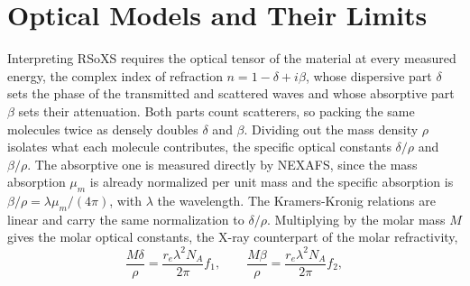 \section{Optical Models and Their Limits}\label{sec:optical-models-and-their-limits}

Interpreting RSoXS requires the optical tensor of the material at every measured energy, the complex index of refraction \(n = 1 - \delta + i\beta\), whose dispersive part \(\delta\) sets the phase of the transmitted and scattered waves and whose absorptive part \(\beta\) sets their attenuation. Both parts count scatterers, so packing the same molecules twice as densely doubles \(\delta\) and \(\beta\). Dividing out the mass density \(\rho\) isolates what each molecule contributes, the specific optical constants \(\delta/\rho\) and \(\beta/\rho\). The absorptive one is measured directly by NEXAFS, since the mass absorption \(\mu_{m}\) is already normalized per unit mass and the specific absorption is \(\beta/\rho = \lambda\mu_{m}/(4\pi)\), with \(\lambda\) the wavelength. The Kramers-Kronig relations are linear and carry the same normalization to \(\delta/\rho\). Multiplying by the molar mass \(M\) gives the molar optical constants, the X-ray counterpart of the molar refractivity,
\begin{equation}
  \frac{M\delta}{\rho} = \frac{r_{e}\lambda^{2}N_{A}}{2\pi}f_{1}, \qquad \frac{M\beta}{\rho} = \frac{r_{e}\lambda^{2}N_{A}}{2\pi}f_{2},
  \label{eq:molar-optical-constants}
\end{equation}
